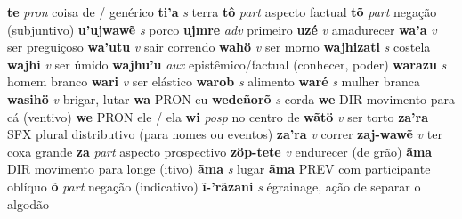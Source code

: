 \textbf{te} \textit{pron} {coisa de / genérico}
\textbf{ti'a} \textit{s} {terra}
\textbf{tô} \textit{part} {aspecto factual}
\textbf{tõ} \textit{part} {negação (subjuntivo)}
\textbf{u'ujwawẽ} \textit{s} {porco}
\textbf{ujmre} \textit{adv} {primeiro}
\textbf{uzé} \textit{v} {amadurecer}
\textbf{wa'a} \textit{v} {ser preguiçoso}
\textbf{wa'utu} \textit{v} {sair correndo}
\textbf{wahö} \textit{v} {ser morno}
\textbf{wajhizati} \textit{s} {costela}
\textbf{wajhi} \textit{v} {ser úmido}
\textbf{wajhu'u} \textit{aux} {epistêmico/factual (conhecer, poder)}
\textbf{warazu} \textit{s} {homem branco}
\textbf{wari} \textit{v} {ser elástico}
\textbf{warob} \textit{s} {alimento}
\textbf{waré} \textit{s} {mulher branca}
\textbf{wasihö} \textit{v} {brigar, lutar}
\textbf{wa} {PRON} {eu}
\textbf{wedeñorõ} \textit{s} {corda}
\textbf{we} {DIR} {movimento para cá (ventivo)}
\textbf{we} {PRON} {ele / ela}
\textbf{wi} \textit{posp} {no centro de}
\textbf{wãtö} \textit{v} {ser torto}
\textbf{za'ra} {SFX} {plural distributivo (para nomes ou eventos)}
\textbf{za'ra} \textit{v} {correr}
\textbf{zaj-wawẽ} \textit{v} {ter coxa grande}
\textbf{za} \textit{part} {aspecto prospectivo}
\textbf{zöp-tete} \textit{v} {endurecer (de grão)}
\textbf{ãma} {DIR} {movimento para longe (itivo)}
\textbf{ãma} \textit{s} {lugar}
\textbf{ãma} {PREV} {com participante oblíquo}
\textbf{õ} \textit{part} {negação (indicativo)}
\textbf{ĩ-'rãzani} \textit{s} {égrainage, ação de separar o algodão}